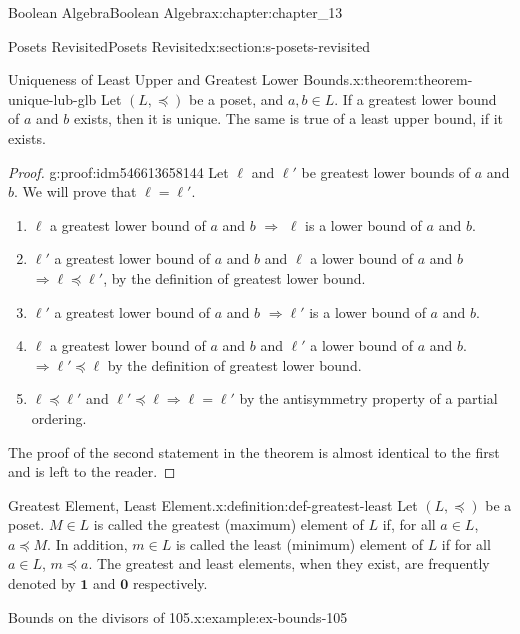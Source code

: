 \documentclass[oneside,10pt,]{book}
\numberwithin{equation}{section}
\begin{document}
\begin{chapterptx}{Boolean Algebra}{}{Boolean Algebra}{}{}{x:chapter:chapter_13}
\begin{sectionptx}{Posets Revisited}{}{Posets Revisited}{}{}{x:section:s-posets-revisited}
\begin{theorem}{Uniqueness of Least Upper and Greatest Lower Bounds.}{}{x:theorem:theorem-unique-lub-glb}%
Let \((L, \preceq)\) be a poset, and \(a, b \in  L\).   If a greatest lower bound of \(a\) and \(b\) exists, then it is unique.  The same is true of a least upper bound, if it exists.%
\end{theorem}
\begin{proof}{}{g:proof:idm546613658144}
Let \(\ell\) and \(\ell'\) be greatest lower bounds of \(a\) and \(b\).   We will prove that \(\ell=\ell'\).%
\begin{enumerate}[label=(\arabic*)]
\item{}\(\ell\) a  greatest lower bound of \(a\) and \(b\) \(\Rightarrow\)  \(\ell\) is a lower bound  of \(a\) and \(b\).%
\item{}\(\ell'\) a greatest lower bound of \(a\) and \(b\) and  \(\ell\)  a lower bound of \(a\) and \(b\) \(\Rightarrow 
\ell \preceq \ell'\), by the definition of greatest lower bound.%
\item{}\(\ell'\) a greatest lower bound of \(a\) and \(b\) \(\Rightarrow  \ell'\) is a lower bound of \(a\) and \(b\).%
\item{}\(\ell\) a greatest lower bound of \(a\) and \(b\) and \(\ell'\)  a lower bound of \(a\) and \(b\). \(\Rightarrow  \ell' \preceq \ell\) by the definition of greatest lower bound.%
\item{}\(\ell\preceq \ell'\) and \(\ell'\preceq \ell \Rightarrow  \ell=\ell'\)  by the antisymmetry property of a partial ordering.%
\end{enumerate}
%
\par
The proof of the second statement in the theorem is almost identical to the first and is left to the reader.%
\end{proof}
\begin{definition}{Greatest Element, Least Element.}{x:definition:def-greatest-least}%
%
%
\label{g:notation:idm546613640176}%
\label{g:notation:idm546613639488}%
Let \((L, \preceq)\) be a poset. \(M \in L\)  is called the greatest (maximum) element of \(L\) if, for all \(a \in  L\),  \(a \preceq  M\). In addition,  \(m \in  L\) is called the least (minimum) element of \(L\)  if for all  \(a \in  L\), \(m \preceq  a\).   The greatest and least elements, when they exist, are frequently denoted by \(\pmb{1}\) and \(\pmb{0}\) respectively.%
\end{definition}
\begin{example}{Bounds on the divisors of 105.}{x:example:ex-bounds-105}%

\end{example}
\end{sectionptx}
\end{chapterptx}
\end{document}
